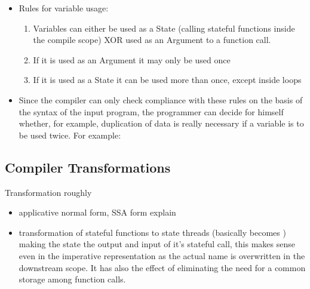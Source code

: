 \begin{itemize}
\item Rules for variable usage: 
\begin{enumerate}
    \item Variables can either be used as a State (calling stateful functions inside the compile scope) XOR used as an Argument to a function call. 
    \item If it is used as an Argument it may only be used once
    \item If it is used as a State it can be used more than once, except inside loops 
\end{enumerate}
\item Since the compiler can only check compliance with these rules on the basis of the syntax of the input program, the programmer can decide for himself whether, for example, duplication of data is really necessary if a variable is to be used twice. For example: 
\end{itemize}

\subsection{Compiler Transformations}
Transformation roughly 
\begin{itemize}
    \item applicative normal form, SSA form \means explain
    \item transformation of stateful functions to state threads (basically  becomes ) making the state the output and input of it's stateful call, this makes sense even in the imperative representation as the actual name is overwritten in the downstream scope. It has also the effect of eliminating the need for a common storage among function calls.
\end{itemize}


